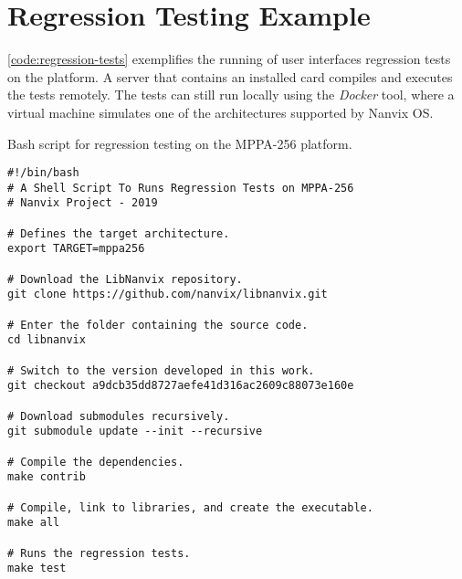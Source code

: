 \section{Regression Testing Example}
\label{sec:code-example}

	\autoref{code:regression-tests} exemplifies the running of user interfaces
	regression tests on the \mppa platform. A server that contains an installed
	\mppa card compiles and executes the tests remotely. The tests can still
	run locally using the \textit{Docker} tool, where a virtual machine
	simulates one of the architectures supported by Nanvix OS.

\begin{listing}[!hb]
\caption{Bash script for regression testing on the MPPA-256 platform.}
\label{code:regression-tests}
\begin{verbatim}
#!/bin/bash
# A Shell Script To Runs Regression Tests on MPPA-256
# Nanvix Project - 2019

# Defines the target architecture.
export TARGET=mppa256

# Download the LibNanvix repository.
git clone https://github.com/nanvix/libnanvix.git

# Enter the folder containing the source code.
cd libnanvix

# Switch to the version developed in this work.
git checkout a9dcb35dd8727aefe41d316ac2609c88073e160e

# Download submodules recursively.
git submodule update --init --recursive

# Compile the dependencies.
make contrib

# Compile, link to libraries, and create the executable.
make all

# Runs the regression tests.
make test
\end{verbatim}
\end{listing}